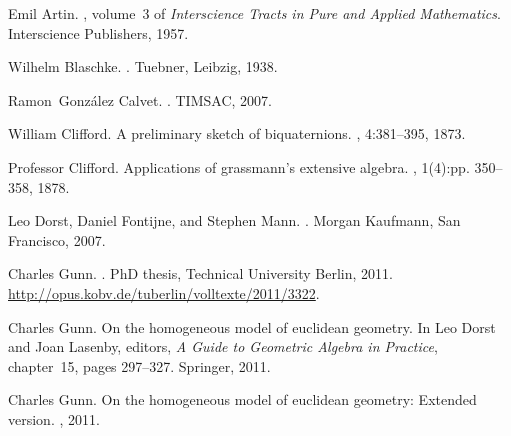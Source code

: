 \documentclass[12pt]{article}
\newcommand{\gTh}{\cite{gunnThesis}\xspace}
\begin{document}
\vspace{-.15in}
%
%

\begin{thebibliography}{Gun16b}

Emil Artin.
, volume~3 of {\em Interscience Tracts in Pure
  and Applied Mathematics}.
\newblock Interscience Publishers, 1957.

Wilhelm Blaschke.
.
\newblock Tuebner, Leibzig, 1938.

Ramon~Gonz\'{a}lez Calvet.
.
\newblock TIMSAC, 2007.

William Clifford.
\newblock A preliminary sketch of biquaternions.
, 4:381--395, 1873.

Professor Clifford.
\newblock Applications of grassmann's extensive algebra.
, 1(4):pp. 350--358, 1878.

Leo Dorst, Daniel Fontijne, and Stephen Mann.
.
\newblock Morgan Kaufmann, San Francisco, 2007.

Charles Gunn.
.
\newblock PhD thesis, Technical University Berlin, 2011.
\newblock \url{http://opus.kobv.de/tuberlin/volltexte/2011/3322}.

Charles Gunn.
\newblock On the homogeneous model of euclidean geometry.
\newblock In Leo Dorst and Joan Lasenby, editors, {\em A Guide to Geometric
  Algebra in Practice}, chapter~15, pages 297--327. Springer, 2011.

Charles Gunn.
\newblock On the homogeneous model of euclidean geometry: Extended version.
, 2011.


\end{thebibliography}
\end{document}
